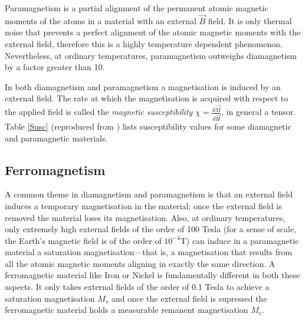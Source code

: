 Paramagnetism is a partial alignment of the permanent atomic magnetic moments of the atoms in a material with an external $\vec{B}$ field. It is only thermal noise that prevents a perfect alignment of the atomic magnetic moments with the external field, therefore this is a highly temperature dependent phenomenon. Nevertheless, at ordinary temperatures, paramagnetism outweighs diamagnetism by a factor greater than 10.\par

In both diamagnetism and paramagnetism a magnetisation is induced by an external field. The rate at which the magnetisation is acquired with respect to the applied field is called the \textit{magnetic susceptibility} $\chi = \frac{d\vec{M}}{d\vec{H}}$, in general a tensor. Table \ref{Susc} (reproduced from \citet{DuOzRM}) lists susceptibility values for some diamagnetic and paramagnetic materials.\par

\subsection{Ferromagnetism}

A common theme in diamagnetism and paramagnetism is that an external field induces a temporary magnetisation in the material; once the external field is removed the material loses its magnetisation. Also, at ordinary temperatures, only extremely high external fields of the order of 100 Tesla (for a sense of scale, the Earth's magnetic field is of the order of $10^{-4}$T) can induce in a paramagnetic material a saturation magnetisation---that is, a magnetisation that results from all the atomic magnetic moments aligning in exactly the same direction. A ferromagnetic material like Iron or Nickel is fundamentally different in both these aspects. It only takes external fields of the order of 0.1 Tesla to achieve a saturation magnetisation $M_s$ and once the external field is supressed the ferromagnetic material holds a measurable remanent magnetisation $M_r$.\par

